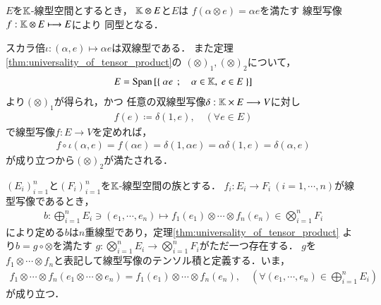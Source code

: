 	\begin{screen}
		\begin{thm}[スカラーとのテンソル積]
			$E$を$\mathbb{K}$-線型空間とするとき，
			$\mathbb{K} \otimes E$と$E$は
			$f(\alpha \otimes e) = \alpha e$を満たす
			線型写像$f:\mathbb{K} \otimes E \longmapsto E$により
			同型となる．
		\end{thm}
	\end{screen}
	
	\begin{prf}
		スカラ倍$\iota:(\alpha, e) \longmapsto \alpha e$は双線型である．
		また定理\ref{thm:universality_of_tensor_product}の
		$(\otimes)_1,(\otimes)_2$について，
		\begin{align}
			E = \mathrm{Span}\left[ \left\{\ \alpha e\ \, ; \quad \alpha \in \mathbb{K},\ e \in E\ \right\} \right]
		\end{align}
		より$(\otimes)_1$が得られ，かつ
		任意の双線型写像$\delta:\mathbb{K} \times E \longrightarrow V$に対し
		\begin{align}
			f(e) \coloneqq \delta(1,e),
			\quad (\forall e \in E)
		\end{align}
		で線型写像$f:E \longrightarrow V$を定めれば，
		\begin{align}
			f \circ \iota (\alpha,e) 
			= f(\alpha e) 
			= \delta(1,\alpha e)
			= \alpha \delta(1,e)
			= \delta (\alpha ,e)
		\end{align}
		が成り立つから$(\otimes)_2$が満たされる．
		\QED
	\end{prf}
	
	\begin{screen}
		\begin{dfn}[線型写像のテンソル積]
				$(E_i)_{i=1}^n$と$(F_i)_{i=1}^n$を$\mathbb{K}$-線型空間の族とする．
				$f_i:E_i \longrightarrow F_i\ (i=1,\cdots,n)$が線型写像であるとき，
				\begin{align}
					b: \bigoplus_{i=1}^n E_i \ni (e_1,\cdots,e_n)
					\longmapsto f_1(e_1)\otimes \cdots \otimes f_n(e_n)
					\in \bigotimes_{i=1}^n F_i
				\end{align}
				により定める$b$は$n$重線型であり，定理\ref{thm:universality_of_tensor_product}
				より$b = g \circ \otimes$を満たす
				$g:\bigotimes_{i=1}^{n} E_i \longrightarrow \bigotimes_{i=1}^{n} F_i$がただ一つ存在する．
				$g$を$f_1 \otimes \cdots \otimes f_n$と表記して線型写像のテンソル積と定義する．いま，
				\begin{align}
					f_1 \otimes \cdots \otimes f_n(e_1 \otimes \cdots \otimes e_n)
					= f_1(e_1)\otimes \cdots \otimes f_n(e_n),
					\quad (\forall (e_1,\cdots,e_n) \in \bigoplus_{i=1}^n E_i)
				\end{align}
				が成り立つ．
		\end{dfn}
	\end{screen}
	
